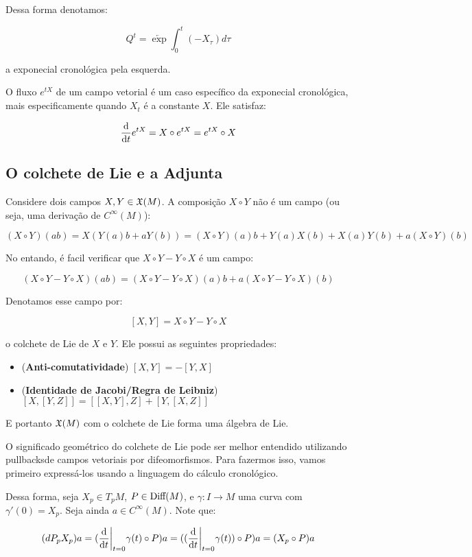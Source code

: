 Dessa forma denotamos:

$$Q^t = \overleftarrow{\exp} \int_0^t (-X_\tau) d\tau$$

a exponecial cronológica pela esquerda.

O fluxo $e^{tX}$ de um campo vetorial é um caso específico da
exponecial cronológica,
mais especificamente quando $X_t$ é a constante $X$.
Ele satisfaz:

$$\frac{\text{d} }{\text{d} t} e^{tX} = X \circ e^{tX} = e^{tX} \circ X$$

\subsection{O colchete de Lie e a Adjunta}

Considere dois campos $X, Y \in \mathfrak{X}(M)$. A composição $X \circ Y$ não é um
campo (ou seja, uma derivação de $C^\infty(M)$):

$$(X \circ Y) (ab) = X(Y(a)b + aY(b)) = (X\circ Y)(a)b + Y(a)X(b) + X(a)Y(b) + a(X\circ Y)(b)$$

No entando, é facil verificar que $X\circ Y - Y \circ X$ é um campo:

$$(X\circ Y - Y \circ X)(ab) = (X\circ Y - Y \circ X)(a)b
+ a(X\circ Y - Y \circ X)(b)$$

Denotamos esse campo por:

$$[X,Y] = X\circ Y - Y \circ X$$

o colchete de Lie de $X$ e $Y$. Ele possui as seguintes propriedades:

\begin{itemize}
    \item (\textbf{Anti-comutatividade}) $[X,Y] = -[Y,X]$
    \item (\textbf{Identidade de Jacobi/Regra de Leibniz}) $[X,[Y,Z]]=
    [[X,Y],Z] + [Y,[X,Z]]$  
\end{itemize}

E portanto $\mathfrak{X}(M)$ com o colchete de Lie forma uma álgebra de Lie.

O significado geométrico do colchete de Lie
pode ser melhor entendido utilizando pullbacksde campos vetoriais por
difeomorfismos. Para fazermos isso, vamos primeiro
expressá-los usando a linguagem do cálculo cronológico.

Dessa forma, seja $X_p \in T_p M$, $P \in \text{Diff}(M)$, e $\gamma: I \to M$ uma curva
com $\gamma'(0) = X_p$. Seja ainda $a \in C^\infty(M)$. Note que:

$$(dP_p X_p) a = (\frac{\text{d} }{\text{d} t}\bigg|_{t=0} \gamma(t) \circ P) a = 
((\frac{\text{d} }{\text{d} t}\bigg|_{t=0}\gamma(t)) \circ P) a = (X_p \circ P)a$$

